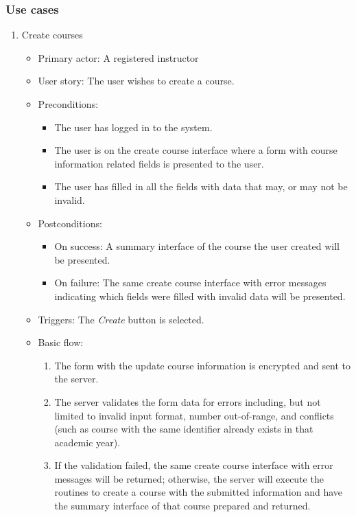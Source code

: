 \subsubsection{Use cases}
\begin{enumerate}
\item Create courses
\begin{itemize}
    \item Primary actor: A registered instructor
    \item User story: The user wishes to create a course.
    \item Preconditions: 
        \begin{itemize}
            \item The user has logged in to the system.
            \item The user is on the create course interface where a form with
                course information related fields is presented to the user.
            \item The user has filled in all the fields with data that may, or
                may not be invalid.
        \end{itemize}
    \item Postconditions:
        \begin{itemize}
            \item On success: A summary interface of the course the user created
                will be presented.
            \item On failure: The same create course interface with error
                messages indicating which fields were filled with invalid data
                will be presented.
        \end{itemize}
    \item Triggers: The \emph{Create} button is selected.
    \item Basic flow:
        \begin{enumerate}
            \item The form with the update course information is encrypted and
                sent to the server.
            \item The server validates the form data for errors including,
                but not limited to invalid input format, number out-of-range,
                and conflicts (such as course with the same identifier  
                already exists in that academic year).
            \item If the validation failed, the same create course interface
                with error messages will be returned; otherwise, the server will
                execute the routines to create a course with the submitted 
                information and have the summary interface of that course prepared
                and returned.
        \end{enumerate}
\end{itemize}


\end{enumerate}
